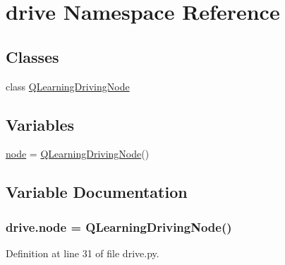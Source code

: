 \hypertarget{namespacedrive}{}\section{drive Namespace Reference}
\label{namespacedrive}
\subsection*{Classes}
\begin{DoxyCompactItemize}
\item 
class \hyperlink{classdrive_1_1_q_learning_driving_node}{Q\+Learning\+Driving\+Node}
\end{DoxyCompactItemize}
\subsection*{Variables}
\begin{DoxyCompactItemize}
\item 
\hyperlink{namespacedrive_a3118901ad129c1aa0fbf3907733dd38d}{node} = \hyperlink{classdrive_1_1_q_learning_driving_node}{Q\+Learning\+Driving\+Node}()
\end{DoxyCompactItemize}


\subsection{Variable Documentation}
\subsubsection[{\texorpdfstring{node}{node}}]{\setlength{\rightskip}{0pt plus 5cm}drive.\+node = {\bf Q\+Learning\+Driving\+Node}()}\hypertarget{namespacedrive_a3118901ad129c1aa0fbf3907733dd38d}{}\label{namespacedrive_a3118901ad129c1aa0fbf3907733dd38d}


Definition at line 31 of file drive.\+py.

